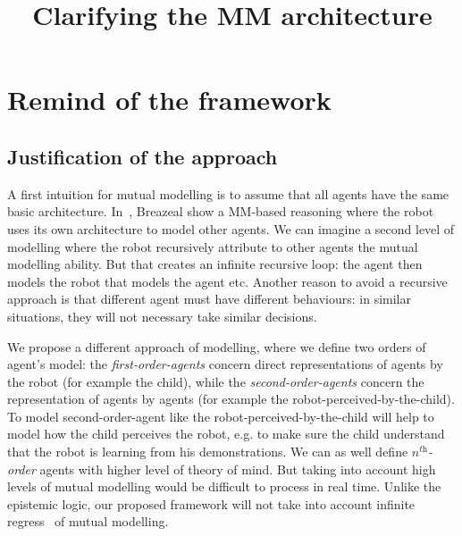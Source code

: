 \documentclass[conference]{IEEEtran}
\begin{document}
\title{Clarifying the MM architecture}


\author{

}



\maketitle

\IEEEpeerreviewmaketitle



\section{Remind of the framework}
\subsection{Justification of the approach}

A first intuition for mutual modelling is to assume that all agents have the same basic architecture. In~\cite{breazeal2006using}, Breazeal show a MM-based reasoning where the robot uses its own architecture to model other agents. We can imagine a second level of modelling where the robot recursively attribute to other agents the mutual modelling ability. But that creates an infinite recursive loop: the agent then models the robot that models the agent etc. Another reason to avoid a recursive approach is that different agent must have different behaviours: in similar situations, they will not necessary take similar decisions. 

We propose a different approach of modelling, where we define two orders of agent's model: the \textit{first-order-agents} concern direct representations of agents by the robot (for example the child), while the \textit{second-order-agents} concern the representation of agents by agents (for example the robot-perceived-by-the-child). 
To model second-order-agent like the robot-perceived-by-the-child will help to model how the child perceives the robot, e.g. to make sure the child understand that the robot is learning from his demonstrations. 
We can as well define \textit{$n^{\textit{th}}$-order} agents with higher level of theory of mind. But taking into account high levels of mutual modelling would be difficult to process in real time. Unlike the epistemic logic, our proposed framework will not take into account infinite regress~\cite{clark1991grounding} of mutual modelling.
\end{document}

